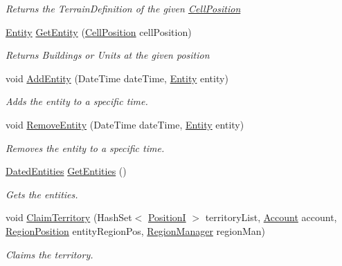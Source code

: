 \begin{DoxyCompactItemize}
\begin{DoxyCompactList}\small\item\em Returns the Terrain\+Definition of the given \hyperlink{classCore_1_1Models_1_1CellPosition}{Cell\+Position} \end{DoxyCompactList}\item 
\hyperlink{classCore_1_1Models_1_1Entity}{Entity} \hyperlink{classCore_1_1Models_1_1Region_aef86ef05f6bc2d535aca5d902e0c2731}{Get\+Entity} (\hyperlink{classCore_1_1Models_1_1CellPosition}{Cell\+Position} cell\+Position)
\begin{DoxyCompactList}\small\item\em Returns Buildings or Units at the given position \end{DoxyCompactList}\item 
void \hyperlink{classCore_1_1Models_1_1Region_ab696b3c1b6cc9d55b3c4eae768339ebd}{Add\+Entity} (Date\+Time date\+Time, \hyperlink{classCore_1_1Models_1_1Entity}{Entity} entity)
\begin{DoxyCompactList}\small\item\em Adds the entity to a specific time. \end{DoxyCompactList}\item 
void \hyperlink{classCore_1_1Models_1_1Region_a05d102bebab28be04e9184ed438b6cda}{Remove\+Entity} (Date\+Time date\+Time, \hyperlink{classCore_1_1Models_1_1Entity}{Entity} entity)
\begin{DoxyCompactList}\small\item\em Removes the entity to a specific time. \end{DoxyCompactList}\item 
\hyperlink{classCore_1_1Models_1_1Region_1_1DatedEntities}{Dated\+Entities} \hyperlink{classCore_1_1Models_1_1Region_a4d5cf1050b208c1d06fcf344027dabf9}{Get\+Entities} ()
\begin{DoxyCompactList}\small\item\em Gets the entities. \end{DoxyCompactList}\item 
void \hyperlink{classCore_1_1Models_1_1Region_a15439b2a135d22eb7fc6a6c5ecabd6b7}{Claim\+Territory} (Hash\+Set$<$ \hyperlink{classCore_1_1Models_1_1PositionI}{Position\+I} $>$ territory\+List, \hyperlink{classCore_1_1Models_1_1Account}{Account} account, \hyperlink{classCore_1_1Models_1_1RegionPosition}{Region\+Position} entity\+Region\+Pos, \hyperlink{classCore_1_1Models_1_1RegionManager}{Region\+Manager} region\+Man)
\begin{DoxyCompactList}\small\item\em Claims the territory. \end{DoxyCompactList}\item 

\end{DoxyCompactItemize}
